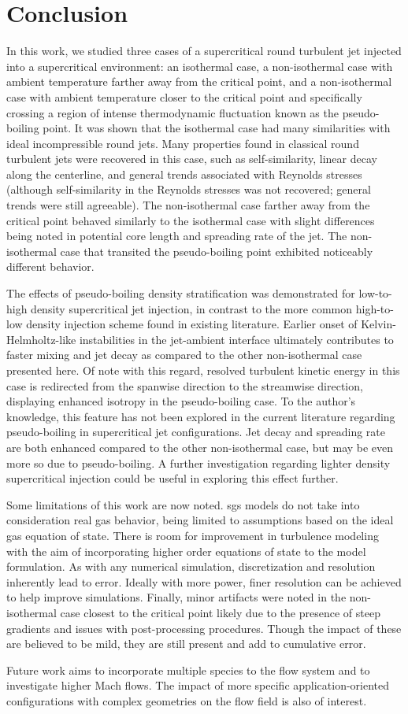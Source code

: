 \chapter{Conclusion}

In this work, we studied three cases of a supercritical round turbulent jet injected into a supercritical environment: an isothermal case, a non-isothermal case with ambient temperature farther away from the critical point, and a non-isothermal case with ambient temperature closer to the critical point and specifically crossing a region of intense thermodynamic fluctuation known as the pseudo-boiling point. It was shown that the isothermal case had many similarities with ideal incompressible round jets. Many properties found in classical round turbulent jets were recovered in this case, such as self-similarity, linear decay along the centerline, and general trends associated with Reynolds stresses (although self-similarity in the Reynolds stresses was not recovered; general trends were still agreeable). The non-isothermal case farther away from the critical point behaved similarly to the isothermal case with slight differences being noted in potential core length and spreading rate of the jet. The non-isothermal case that transited the pseudo-boiling point exhibited noticeably different behavior.

The effects of pseudo-boiling density stratification was demonstrated for low-to-high density supercritical jet injection, in contrast to the more common high-to-low density injection scheme found in existing literature. Earlier onset of Kelvin-Helmholtz-like instabilities in the jet-ambient interface ultimately contributes to faster mixing and jet decay as compared to the other non-isothermal case presented here. Of note with this regard, resolved turbulent kinetic energy in this case is redirected from the spanwise direction to the streamwise direction, displaying enhanced isotropy in the pseudo-boiling case. To the author's knowledge, this feature has not been explored in the current literature regarding pseudo-boiling in supercritical jet configurations. Jet decay and spreading rate are both enhanced compared to the other non-isothermal case, but may be even more so due to pseudo-boiling. A further investigation regarding lighter density supercritical injection could be useful in exploring this effect further. 

Some limitations of this work are now noted. \gls{sgs} models do not take into consideration real gas behavior, being limited to assumptions based on the ideal gas equation of state. There is room for improvement in turbulence modeling with the aim of incorporating higher order equations of state to the model formulation. As with any numerical simulation, discretization and resolution inherently lead to error. Ideally with more power, finer resolution can be achieved to help improve simulations. Finally, minor artifacts were noted in the non-isothermal case closest to the critical point likely due to the presence of steep gradients and issues with post-processing procedures. Though the impact of these are believed to be mild, they are still present and add to cumulative error. 

Future work aims to incorporate multiple species to the flow system and to investigate higher Mach flows. The impact of more specific application-oriented configurations with complex geometries on the flow field is also of interest. 


